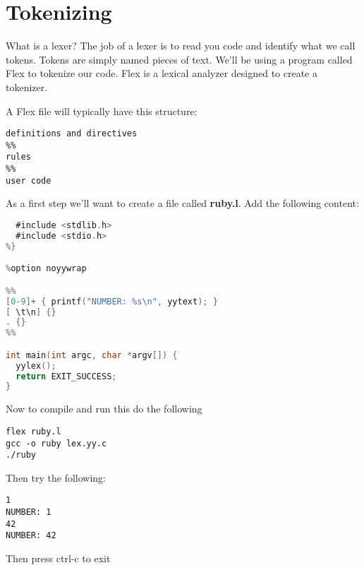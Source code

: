 \chapter{Tokenizing}
What is a lexer? The job of a lexer is to read you code and identify what we call tokens. Tokens are simply named pieces of text. We'll be using a program called Flex to tokenize our code. Flex is a lexical analyzer designed to create a tokenizer.

A Flex file will typically have this structure:

\begin{lstlisting}
definitions and directives
%%
rules
%%
user code
\end{lstlisting}

As a first step we'll want to create a file called {\bf ruby.l}. Add the following content:

\begin{lstlisting}[language=C]
%{
  #include <stdlib.h>
  #include <stdio.h>
%}

%option noyywrap

%%
[0-9]+ { printf("NUMBER: %s\n", yytext); }
[ \t\n] {}
. {}
%%

int main(int argc, char *argv[]) {
  yylex();
  return EXIT_SUCCESS;
}
\end{lstlisting}

Now to compile and run this do the following

\begin{lstlisting}
flex ruby.l
gcc -o ruby lex.yy.c
./ruby
\end{lstlisting}

Then try the following:

\begin{lstlisting}
1
NUMBER: 1
42
NUMBER: 42
\end{lstlisting}

Then press ctrl-c to exit
